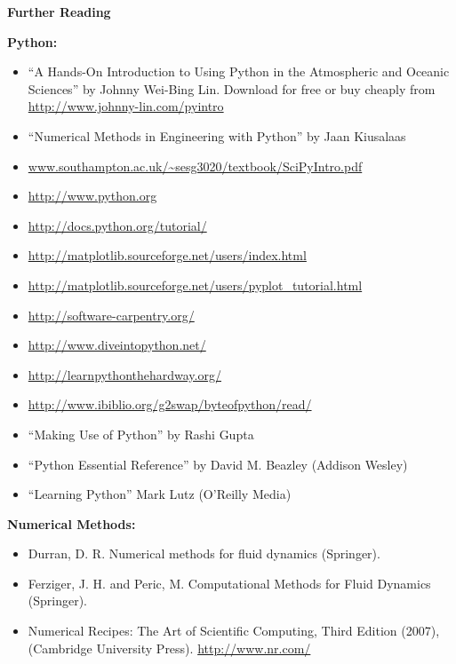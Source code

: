 \clearpage

{\bf\large Further Reading}

{\bf Python:}
\begin{itemize}
\item ``A Hands-On Introduction to Using Python in the Atmospheric and Oceanic Sciences'' by Johnny Wei-Bing Lin. Download for free or buy cheaply from \url{http://www.johnny-lin.com/pyintro}
\item  ``Numerical Methods in Engineering with Python'' by Jaan Kiusalaas
\item \url{www.southampton.ac.uk/~sesg3020/textbook/SciPyIntro.pdf}
\item \url{http://www.python.org}
\item \url{http://docs.python.org/tutorial/}
\item \url{http://matplotlib.sourceforge.net/users/index.html}
\item \url{http://matplotlib.sourceforge.net/users/pyplot_tutorial.html}
\item \url{http://software-carpentry.org/}
\item \url{http://www.diveintopython.net/}
\item \url{http://learnpythonthehardway.org/}
\item \url{http://www.ibiblio.org/g2swap/byteofpython/read/}
\item ``Making Use of Python'' by Rashi Gupta
\item ``Python Essential Reference'' by David M. Beazley (Addison Wesley)
\item ``Learning Python'' Mark Lutz (O'Reilly Media)
\end{itemize}

{\bf Numerical Methods:}
\begin{itemize}
\item Durran, D. R. Numerical methods for fluid dynamics (Springer).
\item Ferziger, J. H. and Peric, M. Computational Methods for Fluid Dynamics (Springer).
\item Numerical Recipes: The Art of Scientific Computing, Third Edition (2007), (Cambridge University Press). \url{http://www.nr.com/}
\end{itemize}




